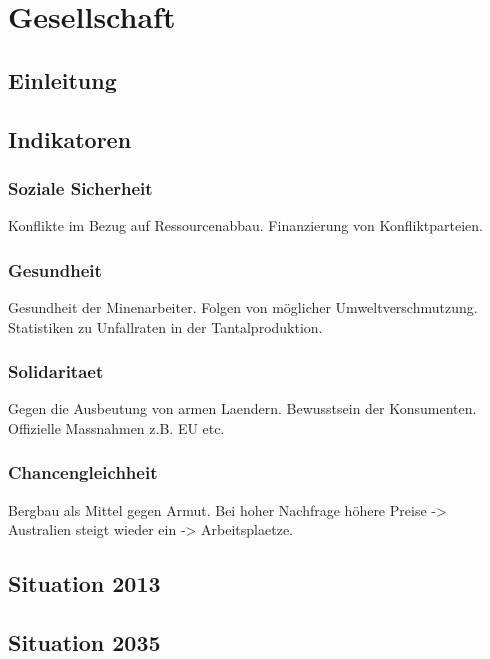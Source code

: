 \section{Gesellschaft}\label{sec:society}

\subsection{Einleitung}

\subsection{Indikatoren}

\subsubsection{Soziale Sicherheit}

Konflikte im Bezug auf Ressourcenabbau.
Finanzierung von Konfliktparteien.

\subsubsection{Gesundheit}

Gesundheit der Minenarbeiter.
Folgen von möglicher Umweltverschmutzung.
Statistiken zu Unfallraten in der Tantalproduktion.

\subsubsection{Solidaritaet}

Gegen die Ausbeutung von armen Laendern.
Bewusstsein der Konsumenten.
Offizielle Massnahmen  z.B. EU etc.

\subsubsection{Chancengleichheit}

Bergbau als Mittel gegen Armut.
Bei hoher Nachfrage höhere Preise -> Australien steigt wieder ein -> Arbeitsplaetze.

\subsection{Situation 2013}

\subsection{Situation 2035}

